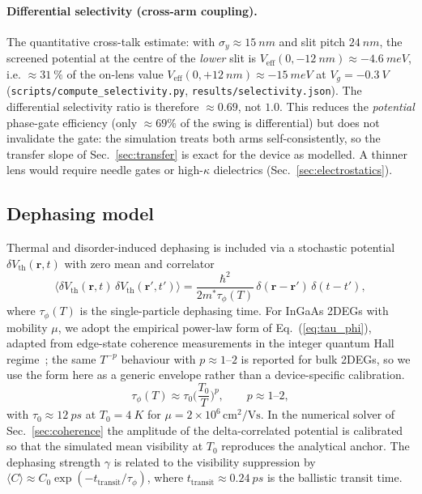 \documentclass[11pt,a4paper]{article}
\newcommand{\expt}[1]{\langle#1\rangle}
\begin{document}
\paragraph{Differential selectivity (cross-arm coupling).} The quantitative
cross-talk estimate: with $\sigma_y\approx\SI{15}{nm}$ and slit pitch
$\SI{24}{nm}$, the screened potential at the centre of the \emph{lower}
slit is $V_{\mathrm{eff}}(0,-\SI{12}{nm})\approx-\SI{4.6}{meV}$, i.e.
$\approx\SI{31}{\percent}$ of the on-lens value
$V_{\mathrm{eff}}(0,+\SI{12}{nm})\approx-\SI{15}{meV}$ at
$V_g=\SI{-0.3}{V}$ (\texttt{scripts/compute\_selectivity.py},
\texttt{results/selectivity.json}). The differential selectivity ratio is
therefore $\approx0.69$, not $1.0$. This reduces the \emph{potential}
phase-gate efficiency (only $\approx69\%$ of the swing is differential) but
does not invalidate the gate: the simulation treats both arms
self-consistently, so the transfer slope of Sec.~\ref{sec:transfer} is
exact for the device as modelled. A thinner lens would require needle gates
or high-$\kappa$ dielectrics (Sec.~\ref{sec:electrostatics}).

\subsection{Dephasing model}
\label{sec:dephasing}

Thermal and disorder-induced dephasing is included via a stochastic potential 
$\delta V_{\text{th}}(\mathbf{r},t)$ with zero mean and correlator~\cite{bylander2011}
\begin{equation}
\expt{\delta V_{\text{th}}(\mathbf{r},t)\,\delta V_{\text{th}}(\mathbf{r}',t')}
= \frac{\hbar^2}{2m^*\tau_\phi(T)}\,\delta(\mathbf{r}-\mathbf{r}')\,\delta(t-t'),
\label{eq:dephasing}
\end{equation}
where $\tau_\phi(T)$ is the single-particle dephasing time. For InGaAs 2DEGs 
with mobility $\mu$, we adopt the empirical power-law form of
Eq.~(\ref{eq:tau_phi}), adapted from edge-state coherence measurements in the 
integer quantum Hall regime~\cite{roulleau2008}; the same $T^{-p}$ behaviour 
with $p\approx1$--$2$ is reported for bulk 2DEGs, so we use the form here as 
a generic envelope rather than a device-specific calibration.
\begin{equation}
\tau_\phi(T) \approx \tau_0\Big(\frac{T_0}{T}\Big)^p,
\qquad p\approx 1\text{--}2,
\label{eq:tau_phi}
\end{equation}
with $\tau_0\approx\SI{12}{ps}$ at $T_0=\SI{4}{K}$ for 
$\mu=2\times10^6\,\text{cm}^2\text{/Vs}$. In the numerical solver of 
Sec.~\ref{sec:coherence} the amplitude of the delta-correlated potential is 
calibrated so that the simulated mean visibility at $T_0$ reproduces the 
analytical anchor. The dephasing strength $\gamma$ is 
related to the visibility suppression by 
$\expt{C}\approx C_0\exp(-t_{\text{transit}}/\tau_\phi)$, where 
$t_{\text{transit}}\approx\SI{0.24}{ps}$ is the ballistic transit time.
\end{document}
